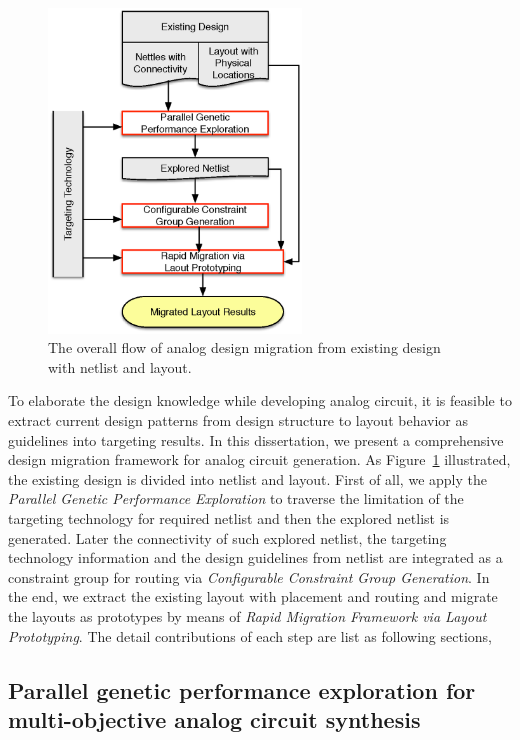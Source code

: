     \begin{figure}[ht]
      \centerline{
      \includegraphics[width=0.6\textwidth]{Fig/Introduction/OverallFlow.eps}}
      \caption{The overall flow of analog design migration from existing design with netlist and layout.} 
      \label{fig:OverallFlow}
    \end{figure}

    To elaborate the design knowledge while developing analog circuit, it is feasible to extract current design patterns from design structure to layout behavior as guidelines into targeting results. In this dissertation, we present a comprehensive design migration framework for analog circuit generation. As Figure~\ref{fig:OverallFlow} illustrated, the existing design is divided into netlist and layout. First of all, we apply the {\it Parallel Genetic Performance Exploration} to traverse the limitation of the targeting technology for required netlist and then the explored netlist is generated. Later the connectivity of such explored netlist, the targeting technology information and the design guidelines from netlist are integrated as a constraint group for routing via {\it Configurable Constraint Group Generation}. In the end, we extract the existing layout with placement and routing and migrate the layouts as prototypes by means of {\it Rapid Migration Framework via Layout Prototyping}. The detail contributions of each step are list as following sections,

   

    

    \subsection{Parallel genetic performance exploration for multi-objective analog circuit synthesis}\label{subsec:PAGEContribute}


